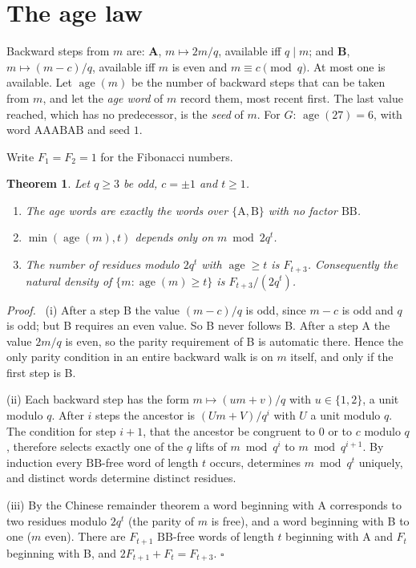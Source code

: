 \documentclass[11pt]{article}
\newtheorem{theorem}{Theorem}
\newenvironment{proof}{\par\noindent\textit{Proof.}\ }{\hfill$\square$\par\medskip}
\newcommand{\age}{\operatorname{age}}
\begin{document}
\section{The age law}

Backward steps from $m$ are: \textbf{A}, $m\mapsto 2m/q$, available iff $q\mid m$; and \textbf{B}, $m\mapsto(m-c)/q$,
available iff $m$ is even and $m\equiv c\pmod q$. At most one is available. Let $\age(m)$ be the number of backward
steps that can be taken from $m$, and let the \emph{age word} of $m$ record them, most recent first. The last value
reached, which has no predecessor, is the \emph{seed} of $m$. For $G$: $\age(27)=6$, with word
$\mathrm{AAABAB}$ and seed $1$.

Write $F_1=F_2=1$ for the Fibonacci numbers.

\begin{theorem}\label{thm:age}
Let $q\ge 3$ be odd, $c=\pm 1$ and $t\ge 1$.
\begin{enumerate}
\item The age words are exactly the words over $\{\mathrm{A},\mathrm{B}\}$ with no factor $\mathrm{BB}$.
\item $\min(\age(m),t)$ depends only on $m \bmod 2q^{t}$.
\item The number of residues modulo $2q^{t}$ with $\age\ge t$ is $F_{t+3}$. Consequently the natural density of
$\{m:\age(m)\ge t\}$ is $F_{t+3}/(2q^{t})$.
\end{enumerate}
\end{theorem}
\begin{proof}
(i) After a step B the value $(m-c)/q$ is odd, since $m-c$ is odd and $q$ is odd; but B requires an even value. So B
never follows B. After a step A the value $2m/q$ is even, so the parity requirement of B is automatic there. Hence
the only parity condition in an entire backward walk is on $m$ itself, and only if the first step is B.

(ii) Each backward step has the form $m\mapsto(um+v)/q$ with $u\in\{1,2\}$, a unit modulo $q$. After $i$ steps the
ancestor is $(Um+V)/q^{i}$ with $U$ a unit modulo $q$. The condition for step $i+1$, that the ancestor be congruent
to $0$ or to $c$ modulo $q$, therefore selects exactly one of the $q$ lifts of $m\bmod q^{i}$ to $m\bmod q^{i+1}$. By
induction every $\mathrm{BB}$-free word of length $t$ occurs, determines $m\bmod q^{t}$ uniquely, and distinct words
determine distinct residues.

(iii) By the Chinese remainder theorem a word beginning with A corresponds to two residues modulo $2q^{t}$ (the
parity of $m$ is free), and a word beginning with B to one ($m$ even). There are $F_{t+1}$ $\mathrm{BB}$-free words
of length $t$ beginning with A and $F_{t}$ beginning with B, and $2F_{t+1}+F_{t}=F_{t+3}$.
\end{proof}
\end{document}
